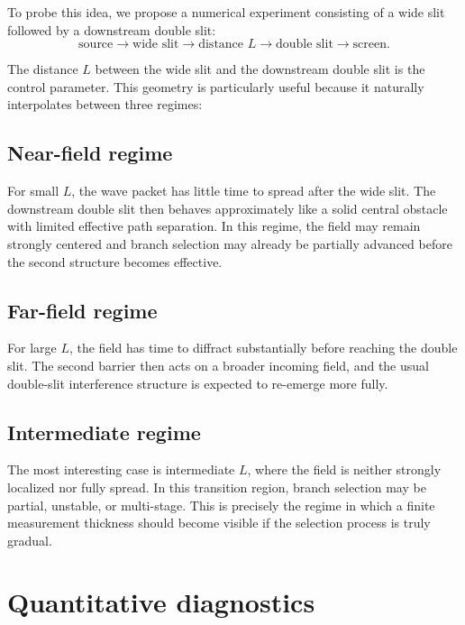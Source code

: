 \documentclass[aps,prl,reprint]{revtex4-2}
\begin{document}
To probe this idea, we propose a numerical experiment consisting of a wide slit
followed by a downstream double slit:
\begin{equation}
\text{source} \rightarrow \text{wide slit} \rightarrow
\text{distance }L \rightarrow \text{double slit} \rightarrow \text{screen}.
\end{equation}

The distance $L$ between the wide slit and the downstream double slit is the
control parameter. This geometry is particularly useful because it naturally
interpolates between three regimes:

\subsection{Near-field regime}

For small $L$, the wave packet has little time to spread after the wide slit.
The downstream double slit then behaves approximately like a solid central
obstacle with limited effective path separation. In this regime, the field may
remain strongly centered and branch selection may already be partially advanced
before the second structure becomes effective.

\subsection{Far-field regime}

For large $L$, the field has time to diffract substantially before reaching the
double slit. The second barrier then acts on a broader incoming field, and the
usual double-slit interference structure is expected to re-emerge more fully.

\subsection{Intermediate regime}

The most interesting case is intermediate $L$, where the field is neither
strongly localized nor fully spread. In this transition region, branch
selection may be partial, unstable, or multi-stage. This is precisely the
regime in which a finite measurement thickness should become visible if the
selection process is truly gradual.

\section{Quantitative diagnostics}
\end{document}
